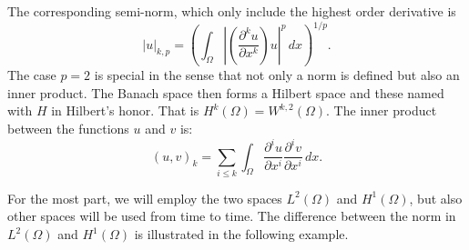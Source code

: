The corresponding semi-norm, which only include the highest order derivative is 
\begin{equation}
\label{semiWpk}
|u|_{k,p} = (\int_\Omega  |(\frac{\partial^k u}{\partial x^k})   u|^p \, dx)^{1/p} .    
\end{equation}
The case $p=2$ is special in the sense that not only a norm is defined but also an inner product.    
The Banach space then forms a Hilbert space and these named with $H$ in Hilbert's honor. 
That is $H^k(\Omega) = W^{k,2}(\Omega)$. The inner product between the functions $u$ and $v$ is:  
\[
(u, v)_{k} = \sum_{i \le k} \int_\Omega \frac{\partial^i u}{\partial x^i} \frac{\partial^i v}{\partial x^i} \,  dx.    
\]

For the most part, we will employ the two spaces $L^2(\Omega)$ and $H^1(\Omega)$, but also other
spaces will be used from time to time.  
The difference between the norm in $L^2(\Omega)$ and $H^1(\Omega)$ is illustrated in the following example.   



